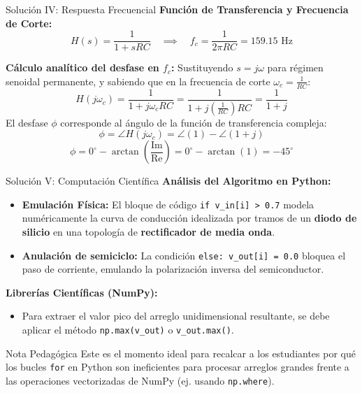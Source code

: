 \documentclass[aspectratio=169]{beamer}
\begin{document}
\begin{frame}{Solución IV: Respuesta Frecuencial}
    \textbf{Función de Transferencia y Frecuencia de Corte:}
    $$H(s) = \frac{1}{1 + s R C} \quad \implies \quad f_c = \frac{1}{2\pi R C} = 159.15\text{ Hz}$$
    \vspace{0.1cm}
    
    \textbf{Cálculo analítico del desfase en $f_c$:}
    Sustituyendo $s = j\omega$ para régimen senoidal permanente, y sabiendo que en la frecuencia de corte $\omega_c = \frac{1}{RC}$:
    $$H(j\omega_c) = \frac{1}{1 + j\omega_c R C} = \frac{1}{1 + j\left(\frac{1}{RC}\right) R C} = \frac{1}{1 + j}$$
    El desfase $\phi$ corresponde al ángulo de la función de transferencia compleja:
    $$\phi = \angle H(j\omega_c) = \angle(1) - \angle(1 + j)$$
    $$\phi = 0^\circ - \arctan\left(\frac{\text{Im}}{\text{Re}}\right) = 0^\circ - \arctan(1) = -45^\circ$$
\end{frame}

\begin{frame}{Solución V: Computación Científica}
    \textbf{Análisis del Algoritmo en Python:}
    \begin{itemize}
        \item \textbf{Emulación Física:} El bloque de código \texttt{if v\_in[i] > 0.7} modela numéricamente la curva de conducción idealizada por tramos de un \textbf{diodo de silicio} en una topología de \textbf{rectificador de media onda}.
        \item \textbf{Anulación de semiciclo:} La condición \texttt{else: v\_out[i] = 0.0} bloquea el paso de corriente, emulando la polarización inversa del semiconductor.
    \end{itemize}
    \vspace{0.3cm}
    \textbf{Librerías Científicas (NumPy):}
    \begin{itemize}
        \item Para extraer el valor pico del arreglo unidimensional resultante, se debe aplicar el método \texttt{np.max(v\_out)} o \texttt{v\_out.max()}.
    \end{itemize}
    
    \begin{block}{Nota Pedagógica}
        Este es el momento ideal para recalcar a los estudiantes por qué los bucles \texttt{for} en Python son ineficientes para procesar arreglos grandes frente a las operaciones vectorizadas de NumPy (ej. usando \texttt{np.where}).
    \end{block}
\end{frame}
\end{document}
